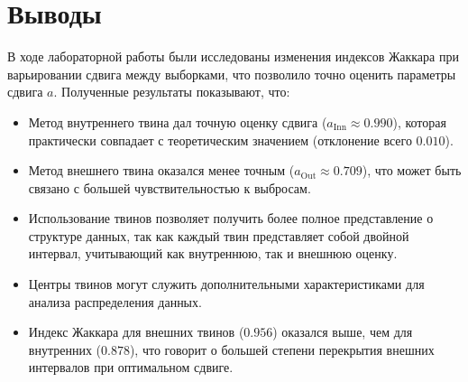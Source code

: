 \documentclass[a4paper]{article}
\begin{document}
    \section{Выводы}
    В ходе лабораторной работы были исследованы изменения индексов Жаккара при варьировании сдвига между выборками,
    что позволило точно оценить параметры сдвига \( a \). Полученные результаты показывают, что:

    \begin{itemize}
        \item Метод внутреннего твина дал точную оценку сдвига (\(a_{\text{Inn}} \approx 0.990\)), 
        которая практически совпадает с теоретическим значением (отклонение всего \(0.010\)).
        \item Метод внешнего твина оказался менее точным (\(a_{\text{Out}} \approx 0.709\)), 
        что может быть связано с большей чувствительностью к выбросам.
        \item Использование твинов позволяет получить более полное представление о структуре данных, 
        так как каждый твин представляет собой двойной интервал, учитывающий как внутреннюю, так и внешнюю оценку.
        \item Центры твинов могут служить дополнительными характеристиками для анализа распределения данных.
        \item Индекс Жаккара для внешних твинов (\(0.956\)) оказался выше, чем для внутренних (\(0.878\)), 
        что говорит о большей степени перекрытия внешних интервалов при оптимальном сдвиге.
    \end{itemize}
\end{document}

